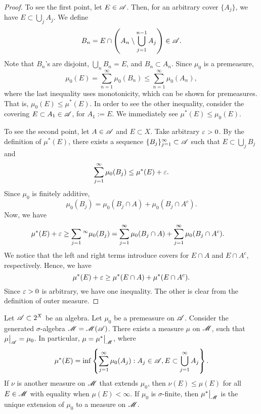 \documentclass[12pt]{article} %
\begin{document}
\begin{proof}
    To see the first point, let $E \in \mathscr{A}$. Then, for an arbitrary cover $\{A_j\}$, we have $E \subset \bigcup_j A_j$. We define \[B_n = E \cap \left(A_n \setminus \bigcup_{j=1}^{n-1} A_{j} \right) \in \mathscr{A}.\] Note that $B_n$'s are disjoint, $\bigcup_n B_n = E$, and $B_n \subset A_n$. Since $\mu_0$ is a premeasure, \[\mu_0(E) = \sum_{n=1}^{\infty} \mu_0(B_n) \leq \sum_{n=1}^{\infty} \mu_0(A_n),\] where the last inequality uses monotonicity, which can be shown for premeasures. That is, $\mu_0(E) \leq \mu^*(E)$. In order to see the other inequality, consider the covering $E \subset A_1 \in \mathscr{A}$, for $A_1 := E$. We immediately see $\mu^*(E) \leq \mu_0(E)$.

    To see the second point, let $A \in \mathscr{A}$ and $E \subset X$. Take arbitrary $\varepsilon > 0$. By the definition of $\mu^*(E)$, there exists a sequence $\{B_j\}_{j=1}^{\infty} \subset \mathscr{A}$ such that $E \subset \bigcup_j B_j$ and \[\sum_{j=1}^{\infty} \mu_0(B_j) \leq \mu^*(E) + \varepsilon.\] Since $\mu_0$ is finitely additive, \[\mu_0(B_j) = \mu_0(B_j \cap A) + \mu_0(B_j \cap A^c).\] Now, we have \begin{align*}
        \mu^*(E) + \varepsilon \geq \sum_{j=1}{^\infty} \mu_0(B_j) &= \sum_{j=1}^{\infty} \mu_0(B_j \cap A) + \sum_{j=1}^{\infty} \mu_0(B_j \cap A^c).
    \end{align*}
    We notice that the left and right terms introduce covers for $E \cap A$ and $E \cap A^c$, respectively. Hence, we have \[\mu^*(E) + \varepsilon \geq \mu^*(E \cap A) + \mu^*(E \cap A^c).\] Since $\varepsilon > 0$ is arbitrary, we have one inequality. The other is clear from the definition of outer measure.
\end{proof}

\begin{theorem}\label{thm:premeasure-induced-measure}
    Let $\mathscr{A} \subset 2^X$ be an algebra. Let $\mu_0$ be a premeasure on $\mathscr{A}$. Consider the generated $\sigma$-algebra $\mathscr{M} = \mathscr{M}(\mathscr{A})$. There exists a measure $\mu$ on $\mathscr{M}$, such that $\restr{\mu}{\SA} = \mu_0$. In particular, $\mu = \restr{\mu^*}{\SM}$, where \[\mu^*(E) = \inf \left\{\sum_{j=1}^{\infty} \mu_0(A_j) : A_j \in \mathscr{A}, E \subset \bigcup_{j=1}^{\infty} A_j \right\}.\] If $\nu$ is another measure on $\mathscr{M}$ that extends $\mu_0$, then $\nu(E) \leq \mu(E)$ for all $E \in \mathscr{M}$ with equality when $\mu(E) < \infty$. If $\mu_0$ is $\sigma$-finite, then $\restr{\mu^*}{\SM}$ is the unique extension of $\mu_0$ to a measure on $\mathscr{M}$.
\end{theorem}
\end{document}

